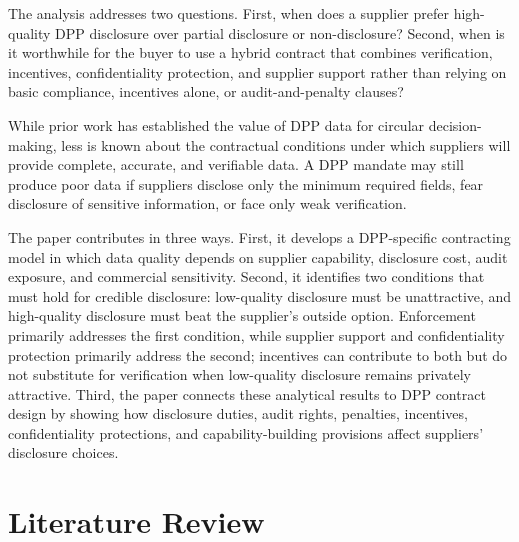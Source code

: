 \documentclass[final,5p,times,authoryear]{elsarticle}
\begin{document}
The analysis addresses two questions. First, when does a supplier prefer high-quality DPP disclosure over partial disclosure or non-disclosure? Second, when is it worthwhile for the buyer to use a hybrid contract that combines verification, incentives, confidentiality protection, and supplier support rather than relying on basic compliance, incentives alone, or audit-and-penalty clauses?

While prior work has established the value of DPP data for circular decision-making, less is known about the contractual conditions under which suppliers will provide complete, accurate, and verifiable data. A DPP mandate may still produce poor data if suppliers disclose only the minimum required fields, fear disclosure of sensitive information, or face only weak verification.

The paper contributes in three ways. First, it develops a DPP-specific contracting model in which data quality depends on supplier capability, disclosure cost, audit exposure, and commercial sensitivity. Second, it identifies two conditions that must hold for credible disclosure: low-quality disclosure must be unattractive, and high-quality disclosure must beat the supplier's outside option. Enforcement primarily addresses the first condition, while supplier support and confidentiality protection primarily address the second; incentives can contribute to both but do not substitute for verification when low-quality disclosure remains privately attractive. Third, the paper connects these analytical results to DPP contract design by showing how disclosure duties, audit rights, penalties, incentives, confidentiality protections, and capability-building provisions affect suppliers' disclosure choices.

\section{Literature Review}
\end{document}
